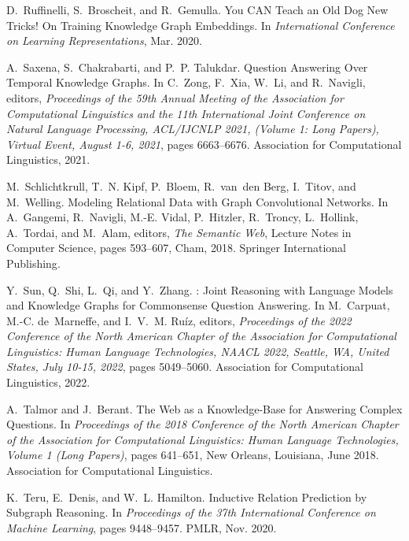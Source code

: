 \documentclass[11pt]{article}
\begin{document}
\begin{thebibliography}{10}
\begin{small}
D.~Ruffinelli, S.~Broscheit, and R.~Gemulla.
\newblock You {{CAN Teach}} an {{Old Dog New Tricks}}! {{On Training Knowledge
		Graph Embeddings}}.
\newblock In {\em International {{Conference}} on {{Learning
			Representations}}}, Mar. 2020.

A.~Saxena, S.~Chakrabarti, and P.~P. Talukdar.
\newblock Question {{Answering Over Temporal Knowledge Graphs}}.
\newblock In C.~Zong, F.~Xia, W.~Li, and R.~Navigli, editors, {\em Proceedings
	of the 59th {{Annual Meeting}} of the {{Association}} for {{Computational
			Linguistics}} and the 11th {{International Joint Conference}} on {{Natural
			Language Processing}}, {{ACL}}/{{IJCNLP}} 2021, ({{Volume}} 1: {{Long
			Papers}}), {{Virtual Event}}, {{August}} 1-6, 2021}, pages 6663--6676.
{Association for Computational Linguistics}, 2021.

M.~Schlichtkrull, T.~N. Kipf, P.~Bloem, R.~{van~den Berg}, I.~Titov, and
M.~Welling.
\newblock Modeling {{Relational Data}} with {{Graph Convolutional Networks}}.
\newblock In A.~Gangemi, R.~Navigli, M.-E. Vidal, P.~Hitzler, R.~Troncy,
L.~Hollink, A.~Tordai, and M.~Alam, editors, {\em The {{Semantic Web}}},
Lecture {{Notes}} in {{Computer Science}}, pages 593--607, {Cham}, 2018.
{Springer International Publishing}.

Y.~Sun, Q.~Shi, L.~Qi, and Y.~Zhang.
: {{Joint Reasoning}} with {{Language Models}} and
{{Knowledge Graphs}} for {{Commonsense Question Answering}}.
\newblock In M.~Carpuat, M.-C. de~Marneffe, and I.~V.~M. Ru{\'i}z, editors,
{\em Proceedings of the 2022 {{Conference}} of the {{North American Chapter}}
	of the {{Association}} for {{Computational Linguistics}}: {{Human Language
			Technologies}}, {{NAACL}} 2022, {{Seattle}}, {{WA}}, {{United States}},
	{{July}} 10-15, 2022}, pages 5049--5060. {Association for Computational
	Linguistics}, 2022.

A.~Talmor and J.~Berant.
\newblock The {{Web}} as a {{Knowledge-Base}} for {{Answering Complex
		Questions}}.
\newblock In {\em Proceedings of the 2018 {{Conference}} of the {{North
			American Chapter}} of the {{Association}} for {{Computational Linguistics}}:
	{{Human Language Technologies}}, {{Volume}} 1 ({{Long Papers}})}, pages
641--651, {New Orleans, Louisiana}, June 2018. {Association for Computational
	Linguistics}.

K.~Teru, E.~Denis, and W.~L. Hamilton.
\newblock Inductive {{Relation Prediction}} by {{Subgraph Reasoning}}.
\newblock In {\em Proceedings of the 37th {{International Conference}} on
	{{Machine Learning}}}, pages 9448--9457. {PMLR}, Nov. 2020.


\end{small}
\end{thebibliography}
\end{document}
